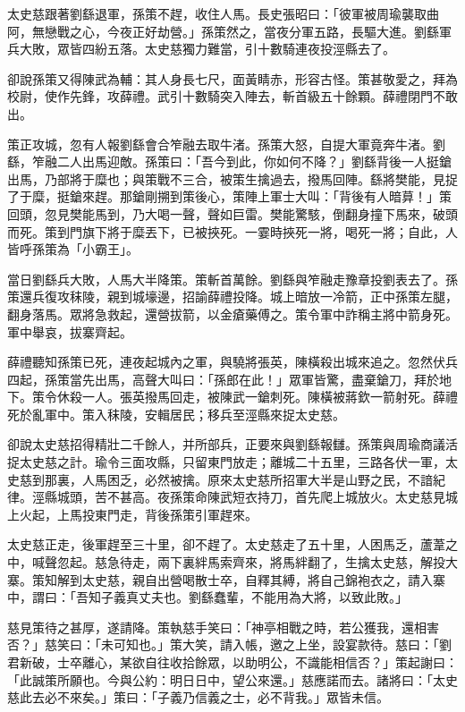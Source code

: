 太史慈跟著劉繇退軍，孫策不趕，收住人馬。長史張昭曰：「彼軍被周瑜襲取曲阿，無戀戰之心，今夜正好劫營。」孫策然之，當夜分軍五路，長驅大進。劉繇軍兵大敗，眾皆四紛五落。太史慈獨力難當，引十數騎連夜投涇縣去了。

卻說孫策又得陳武為輔：其人身長七尺，面黃睛赤，形容古怪。策甚敬愛之，拜為校尉，使作先鋒，攻薛禮。武引十數騎突入陣去，斬首級五十餘顆。薛禮閉門不敢出。

策正攻城，忽有人報劉繇會合笮融去取牛渚。孫策大怒，自提大軍竟奔牛渚。劉繇，笮融二人出馬迎敵。孫策曰：「吾今到此，你如何不降？」劉繇背後一人挺鎗出馬，乃部將于糜也；與策戰不三合，被策生擒過去，撥馬回陣。繇將樊能，見捉了于糜，挺鎗來趕。那鎗剛搠到策後心，策陣上軍士大叫：「背後有人暗萛！」策回頭，忽見樊能馬到，乃大喝一聲，聲如巨雷。樊能驚駭，倒翻身撞下馬來，破頭而死。策到門旗下將于糜丟下，已被挾死。一霎時挾死一將，喝死一將；自此，人皆呼孫策為「小霸王」。

當日劉繇兵大敗，人馬大半降策。策斬首萬餘。劉繇與笮融走豫章投劉表去了。孫策還兵復攻秣陵，親到城壕邊，招諭薛禮投降。城上暗放一冷箭，正中孫策左腿，翻身落馬。眾將急救起，還營拔箭，以金瘡藥傅之。策令軍中詐稱主將中箭身死。軍中舉哀，拔寨齊起。

薛禮聽知孫策已死，連夜起城內之軍，與驍將張英，陳橫殺出城來追之。忽然伏兵四起，孫策當先出馬，高聲大叫曰：「孫郎在此！」眾軍皆驚，盡棄鎗刀，拜於地下。策令休殺一人。張英撥馬回走，被陳武一鎗刺死。陳橫被蔣欽一箭射死。薛禮死於亂軍中。策入秣陵，安輯居民；移兵至涇縣來捉太史慈。

卻說太史慈招得精壯二千餘人，并所部兵，正要來與劉繇報讎。孫策與周瑜商議活捉太史慈之計。瑜令三面攻縣，只留東門放走；離城二十五里，三路各伏一軍，太史慈到那裏，人馬困乏，必然被擒。原來太史慈所招軍大半是山野之民，不諳紀律。涇縣城頭，苦不甚高。夜孫策命陳武短衣持刀，首先爬上城放火。太史慈見城上火起，上馬投東門走，背後孫策引軍趕來。

太史慈正走，後軍趕至三十里，卻不趕了。太史慈走了五十里，人困馬乏，蘆葦之中，喊聲忽起。慈急待走，兩下裏絆馬索齊來，將馬絆翻了，生擒太史慈，解投大寨。策知解到太史慈，親自出營喝散士卒，自釋其縛，將自己錦袍衣之，請入寨中，謂曰：「吾知子義真丈夫也。劉繇蠢輩，不能用為大將，以致此敗。」

慈見策待之甚厚，遂請降。策執慈手笑曰：「神亭相戰之時，若公獲我，還相害否？」慈笑曰：「未可知也。」策大笑，請入帳，邀之上坐，設宴款待。慈曰：「劉君新破，士卒離心，某欲自往收拾餘眾，以助明公，不識能相信否？」策起謝曰：「此誠策所願也。今與公約：明日日中，望公來還。」慈應諾而去。諸將曰：「太史慈此去必不來矣。」策曰：「子義乃信義之士，必不背我。」眾皆未信。

